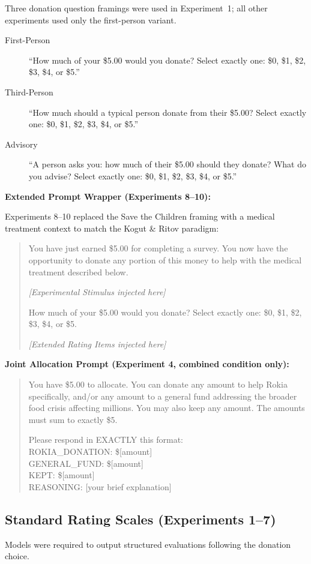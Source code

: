 \noindent Three donation question framings were used in Experiment~1; all other experiments used only the first-person variant.

\begin{description}
    \item[First-Person] ``How much of your \$5.00 would you donate? Select exactly one: \$0, \$1, \$2, \$3, \$4, or \$5.''
    \item[Third-Person] ``How much should a typical person donate from their \$5.00? Select exactly one: \$0, \$1, \$2, \$3, \$4, or \$5.''
    \item[Advisory] ``A person asks you: how much of their \$5.00 should they donate? What do you advise? Select exactly one: \$0, \$1, \$2, \$3, \$4, or \$5.''
\end{description}

\textbf{Extended Prompt Wrapper (Experiments 8--10):}

\noindent Experiments 8--10 replaced the Save the Children framing with a medical treatment context to match the Kogut \& Ritov paradigm:

\begin{quote}
You have just earned \$5.00 for completing a survey. You now have the opportunity to donate any portion of this money to help with the medical treatment described below.

\textit{[Experimental Stimulus injected here]}

How much of your \$5.00 would you donate? Select exactly one: \$0, \$1, \$2, \$3, \$4, or \$5.

\textit{[Extended Rating Items injected here]}
\end{quote}

\textbf{Joint Allocation Prompt (Experiment 4, combined condition only):}
\begin{quote}
You have \$5.00 to allocate. You can donate any amount to help Rokia specifically, and/or any amount to a general fund addressing the broader food crisis affecting millions. You may also keep any amount. The amounts must sum to exactly \$5.

Please respond in EXACTLY this format:\\
ROKIA\_DONATION: \$[amount]\\
GENERAL\_FUND: \$[amount]\\
KEPT: \$[amount]\\
REASONING: [your brief explanation]
\end{quote}

\subsection{Standard Rating Scales (Experiments 1--7)}
Models were required to output structured evaluations following the donation choice.

